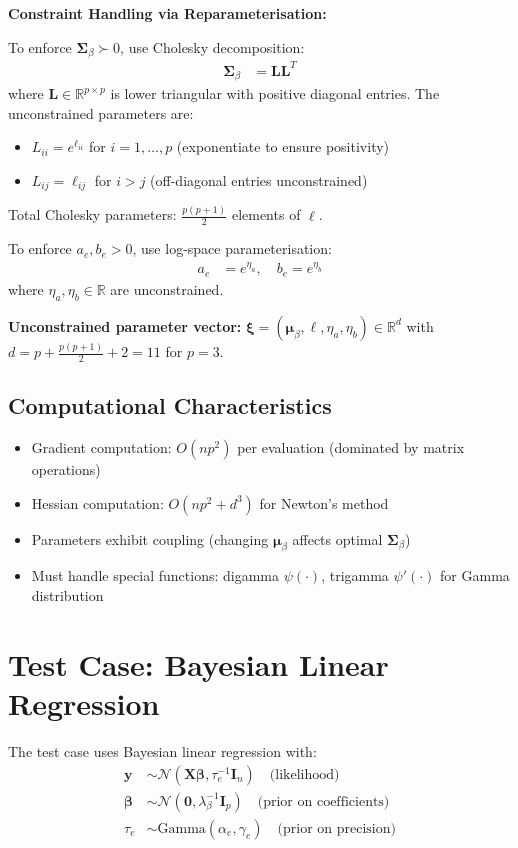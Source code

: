 \documentclass[11pt]{article}
\newcommand{\R}{\mathbb{R}}
\newcommand{\N}{\mathcal{N}}
\begin{document}
\textbf{Constraint Handling via Reparameterisation:}

To enforce $\bm{\Sigma}_\beta \succ 0$, use Cholesky decomposition:
\begin{align}
\bm{\Sigma}_\beta &= \bm{L}\bm{L}^T
\end{align}
where $\bm{L} \in \R^{p \times p}$ is lower triangular with positive diagonal entries. The unconstrained parameters are:
\begin{itemize}
\item $L_{ii} = e^{\ell_{ii}}$ for $i=1,\ldots,p$ (exponentiate to ensure positivity)
\item $L_{ij} = \ell_{ij}$ for $i > j$ (off-diagonal entries unconstrained)
\end{itemize}

Total Cholesky parameters: $\frac{p(p+1)}{2}$ elements of $\bm{\ell}$.

To enforce $a_e, b_e > 0$, use log-space parameterisation:
\begin{align}
a_e &= e^{\eta_a}, \quad b_e = e^{\eta_b}
\end{align}
where $\eta_a, \eta_b \in \R$ are unconstrained.

\textbf{Unconstrained parameter vector:} $\bm{\xi} = (\bm{\mu}_\beta, \bm{\ell}, \eta_a, \eta_b) \in \R^d$ with $d = p + \frac{p(p+1)}{2} + 2 = 11$ for $p=3$.

\subsection*{Computational Characteristics}

\begin{itemize}
\item Gradient computation: $O(np^2)$ per evaluation (dominated by matrix operations)
\item Hessian computation: $O(np^2 + d^3)$ for Newton's method
\item Parameters exhibit coupling (changing $\bm{\mu}_\beta$ affects optimal $\bm{\Sigma}_\beta$)
\item Must handle special functions: digamma $\psi(\cdot)$, trigamma $\psi'(\cdot)$ for Gamma distribution
\end{itemize}
\newpage
\section*{Test Case: Bayesian Linear Regression}

The test case uses Bayesian linear regression with:
\begin{align}
\bm{y} &\sim \N(\bm{X}\bm{\beta}, \tau_e^{-1} \bm{I}_n) \quad \text{(likelihood)}\\
\bm{\beta} &\sim \N(\bm{0}, \lambda_\beta^{-1} \bm{I}_p) \quad \text{(prior on coefficients)}\\
\tau_e &\sim \text{Gamma}(\alpha_e, \gamma_e) \quad \text{(prior on precision)}
\end{align}
\end{document}
